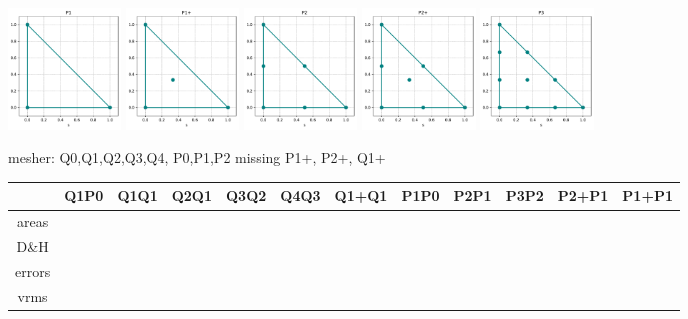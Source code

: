 \includegraphics[width=3cm]{python_codes/fieldstone_120/spaces/P1_nodes}
\includegraphics[width=3cm]{python_codes/fieldstone_120/spaces/P1+_nodes}
\includegraphics[width=3cm]{python_codes/fieldstone_120/spaces/P2_nodes}
\includegraphics[width=3cm]{python_codes/fieldstone_120/spaces/P2+_nodes}
\includegraphics[width=3cm]{python_codes/fieldstone_120/spaces/P3_nodes}

mesher: Q0,Q1,Q2,Q3,Q4, P0,P1,P2   missing P1+, P2+, Q1+

\begin{tabular}{ccccccccccc}
      & Q1P0 & Q1Q1 & Q2Q1 & Q3Q2 & Q4Q3 & Q1+Q1 & P1P0 & P2P1 & P3P2 & P2+P1 & P1+P1 \\
\hline
areas  &  &&&&&&&&& \\ 
D\&H   &  \\
errors &  \\
vrms   &  \\
\hline
\end{tabular}

